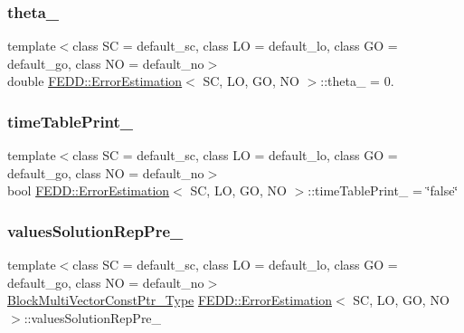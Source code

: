 \subsubsection{\texorpdfstring{theta\+\_\+}{theta\_}}
{\footnotesize\ttfamily template$<$class SC = default\+\_\+sc, class LO = default\+\_\+lo, class GO = default\+\_\+go, class NO = default\+\_\+no$>$ \\
double \hyperlink{classFEDD_1_1ErrorEstimation}{F\+E\+D\+D\+::\+Error\+Estimation}$<$ SC, LO, GO, NO $>$\+::theta\+\_\+ = 0.}

\mbox{\label{classFEDD_1_1ErrorEstimation_aa1eaedab0d65507fec1b175f971bdecd}} 
\subsubsection{\texorpdfstring{time\+Table\+Print\+\_\+}{timeTablePrint\_}}
{\footnotesize\ttfamily template$<$class SC = default\+\_\+sc, class LO = default\+\_\+lo, class GO = default\+\_\+go, class NO = default\+\_\+no$>$ \\
bool \hyperlink{classFEDD_1_1ErrorEstimation}{F\+E\+D\+D\+::\+Error\+Estimation}$<$ SC, LO, GO, NO $>$\+::time\+Table\+Print\+\_\+ = \char`\"{}false\char`\"{}}

\mbox{\label{classFEDD_1_1ErrorEstimation_a253bb0380e34ce735919c79ba9ddd4d4}} 
\subsubsection{\texorpdfstring{values\+Solution\+Rep\+Pre\+\_\+}{valuesSolutionRepPre\_}}
{\footnotesize\ttfamily template$<$class SC = default\+\_\+sc, class LO = default\+\_\+lo, class GO = default\+\_\+go, class NO = default\+\_\+no$>$ \\
\hyperlink{classFEDD_1_1ErrorEstimation_a8a53d809dfcf71abaffe46f85e6b4aa1}{Block\+Multi\+Vector\+Const\+Ptr\+\_\+\+Type} \hyperlink{classFEDD_1_1ErrorEstimation}{F\+E\+D\+D\+::\+Error\+Estimation}$<$ SC, LO, GO, NO $>$\+::values\+Solution\+Rep\+Pre\+\_\+\hspace{0.3cm}{\ttfamily [protected]}}

